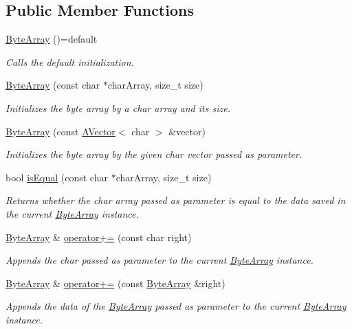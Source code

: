 \subsection*{Public Member Functions}
\begin{DoxyCompactItemize}
\item 
\mbox{\label{class_byte_array_a7976b9304340be61157d5f6401cbd506}} 
\mbox{\hyperlink{class_byte_array_a7976b9304340be61157d5f6401cbd506}{Byte\+Array}} ()=default
\begin{DoxyCompactList}\small\item\em Calls the default initialization. \end{DoxyCompactList}\item 
\mbox{\hyperlink{class_byte_array_a5370ae20f7491913d891a624ea77ad52}{Byte\+Array}} (const char $\ast$char\+Array, size\+\_\+t size)
\begin{DoxyCompactList}\small\item\em Initializes the byte array by a char array and its size. \end{DoxyCompactList}\item 
\mbox{\hyperlink{class_byte_array_a94a65f2b5c6952713712e23a574b0295}{Byte\+Array}} (const \mbox{\hyperlink{class_a_vector}{A\+Vector}}$<$ char $>$ \&vector)
\begin{DoxyCompactList}\small\item\em Initializes the byte array by the given char vector passed as parameter. \end{DoxyCompactList}\item 
bool \mbox{\hyperlink{class_byte_array_a4c0af1c1fe9ee1e6fa1e8ce7b0bde83a}{is\+Equal}} (const char $\ast$char\+Array, size\+\_\+t size)
\begin{DoxyCompactList}\small\item\em Returns whether the char array passed as parameter is equal to the data saved in the current \mbox{\hyperlink{class_byte_array}{Byte\+Array}} instance. \end{DoxyCompactList}\item 
\mbox{\hyperlink{class_byte_array}{Byte\+Array}} \& \mbox{\hyperlink{class_byte_array_aa8900e73d7ba3cea9aca18d037a2d017}{operator+=}} (const char right)
\begin{DoxyCompactList}\small\item\em Appends the char passed as parameter to the current \mbox{\hyperlink{class_byte_array}{Byte\+Array}} instance. \end{DoxyCompactList}\item 
\mbox{\hyperlink{class_byte_array}{Byte\+Array}} \& \mbox{\hyperlink{class_byte_array_ab3635362b3abb48c398b38d91e37433b}{operator+=}} (const \mbox{\hyperlink{class_byte_array}{Byte\+Array}} \&right)
\begin{DoxyCompactList}\small\item\em Appends the data of the \mbox{\hyperlink{class_byte_array}{Byte\+Array}} passed as parameter to the current \mbox{\hyperlink{class_byte_array}{Byte\+Array}} instance. \end{DoxyCompactList}\end{DoxyCompactItemize}


